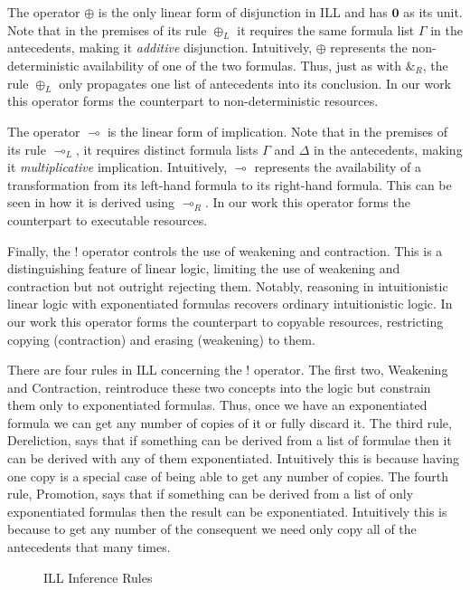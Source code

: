 \documentclass[class=smolathesis,crop=false]{standalone}
\begin{document}
The operator $\oplus$ is the only linear form of disjunction in ILL and has $\mathbf{0}$ as its unit.
Note that in the premises of its rule $\oplus_L$ it requires the same formula list $\Gamma$ in the antecedents, making it \emph{additive} disjunction.
Intuitively, $\oplus$ represents the non-deterministic availability of one of the two formulas.
Thus, just as with $\&_R$, the rule $\oplus_L$ only propagates one list of antecedents into its conclusion.
In our work this operator forms the counterpart to non-deterministic resources.

The operator $\multimap$ is the linear form of implication.
Note that in the premises of its rule $\multimap_L$, it requires distinct formula lists $\Gamma$ and $\Delta$ in the antecedents, making it \emph{multiplicative} implication.
Intuitively, $\multimap$ represents the availability of a transformation from its left-hand formula to its right-hand formula.
This can be seen in how it is derived using $\multimap_R$.
In our work this operator forms the counterpart to executable resources.

Finally, the $!$ operator controls the use of weakening and contraction.
This is a distinguishing feature of linear logic, limiting the use of weakening and contraction but not outright rejecting them.
Notably, reasoning in intuitionistic linear logic with exponentiated formulas recovers ordinary intuitionistic logic.
In our work this operator forms the counterpart to copyable resources, restricting copying (contraction) and erasing (weakening) to them.

There are four rules in ILL concerning the $!$ operator.
The first two, Weakening and Contraction, reintroduce these two concepts into the logic but constrain them only to exponentiated formulas.
Thus, once we have an exponentiated formula we can get any number of copies of it or fully discard it.
The third rule, Dereliction, says that if something can be derived from a list of formulae then it can be derived with any of them exponentiated.
Intuitively this is because having one copy is a special case of being able to get any number of copies.
The fourth rule, Promotion, says that if something can be derived from a list of only exponentiated formulas then the result can be exponentiated.
Intuitively this is because to get any number of the consequent we need only copy all of the antecedents that many times.

\begin{figure}[htbp]
  \centering
  
  \caption{ILL Inference Rules}
  \label{fig:ill-rules}
\end{figure}
\end{document}
